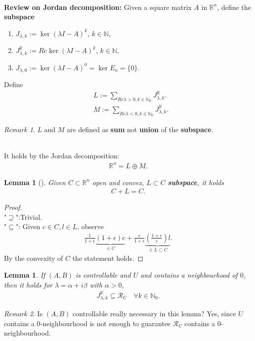 \documentclass[a4paper,11pt,fleqn]{book}
\newtheorem{lemma}[theorem]{Lemma}
\theoremstyle{definition}
\theoremstyle{remark}
\newtheorem*{remark}{Remark}
\begin{document}
\quad\\
\textbf{Review on Jordan decomposition:}
Given a square matrix $A$ in $\mathbb{R}^n$, define the \textbf{subspace}
\begin{enumerate}
	\item $J_{\lambda, k}:= \ker (\lambda I - A)^k $, $k \in \mathbb{N}$,
	\item $J_{\lambda, k}^\mathbb{R} := Re \ker (\lambda I - A)^k$, $k \in \mathbb{N}$, 
	\item $J_{\lambda, 0}:= \ker (\lambda I - A)^0 = \ker E_n = \{0\}. $
\end{enumerate}
Define 
\begin{align*}
	& L:= \sum_{ Re\lambda > 0, k \in \mathbb{N}_0} J_{\lambda, k}^{\mathbb{R}}.\\
	& M:= \sum_{ Re\lambda < 0, k \in \mathbb{N}_0} J_{\lambda, k}^{\mathbb{R}}.
\end{align*}
\begin{remark}
$L$ and $M$ are defined as \textbf{sum} not \textbf{union} of the \textbf{subspace}.	
\end{remark}

\quad\\
It holds by the Jordan decomposition: 
\begin{align*}
	\mathbb{R}^n = L \oplus M. 
\end{align*}

\begin{lemma}[]
	Given $C \subset \mathbb{R}^n$ open and convex, $L \subset C$ \textbf{subspace}, it holds
	\begin{align*}
		C + L = C. 
	\end{align*}
\end{lemma}
\begin{proof}
\quad\\
"$\supseteq$":Trivial. \\
"$\subseteq$": Given $c \in C, l \in L$, observe
\begin{align*}
	\frac{1}{1 + \epsilon} \underbrace{ (1 + \epsilon) c}_{\in C  } + \frac{\epsilon}{1 + \epsilon} \underbrace{(\frac{1 + \epsilon}{\epsilon})l}_{ \in L \subset C } . 
\end{align*}
By the convexity of $C$ the statement holds.
\end{proof}


\begin{lemma}
	If $(A, B)$ is controllable and $U$  and contains a neighbourhood of $0$, then it holds for $\lambda = \alpha + i \beta$ with $\alpha > 0$,
	\begin{align*}
		J_{\lambda, k}^{\mathbb{R}} \subseteq \mathcal{R}_U \quad \forall k \in \mathbb{N}_0.
	\end{align*}
\end{lemma}
\begin{remark}
Is $(A, B)$ controllable really necessary in this lemma? Yes, since $U$ contains a 0-neighbourhood is not enough to guarantee $\mathcal{R}_U$ contains a 0-neighbourhood.  	
\end{remark}
\end{document}
